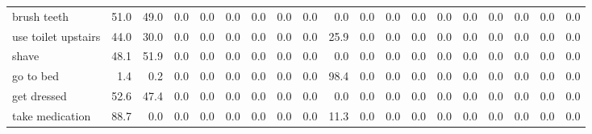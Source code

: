 \documentclass{article}
\begin{document}
\begin{sideways}
\begin{tabular}{lrrrrrrrrrrrrrrrrrr}
brush teeth                   &        51.0 &               49.0 &           0.0 &                          0.0 &                0.0 &                0.0 &                        0.0 &          0.0 &              0.0 &                0.0 &                    0.0 &                      0.0 &                  0.0 &                   0.0 &              0.0 &              0.0 &                                  0.0 &          0.0 \\
use toilet upstairs           &        44.0 &               30.0 &           0.0 &                          0.0 &                0.0 &                0.0 &                        0.0 &          0.0 &             25.9 &                0.0 &                    0.0 &                      0.0 &                  0.0 &                   0.0 &              0.0 &              0.0 &                                  0.0 &          0.0 \\
shave                         &        48.1 &               51.9 &           0.0 &                          0.0 &                0.0 &                0.0 &                        0.0 &          0.0 &              0.0 &                0.0 &                    0.0 &                      0.0 &                  0.0 &                   0.0 &              0.0 &              0.0 &                                  0.0 &          0.0 \\
go to bed                     &         1.4 &                0.2 &           0.0 &                          0.0 &                0.0 &                0.0 &                        0.0 &          0.0 &             98.4 &                0.0 &                    0.0 &                      0.0 &                  0.0 &                   0.0 &              0.0 &              0.0 &                                  0.0 &          0.0 \\
get dressed                   &        52.6 &               47.4 &           0.0 &                          0.0 &                0.0 &                0.0 &                        0.0 &          0.0 &              0.0 &                0.0 &                    0.0 &                      0.0 &                  0.0 &                   0.0 &              0.0 &              0.0 &                                  0.0 &          0.0 \\
take medication               &        88.7 &                0.0 &           0.0 &                          0.0 &                0.0 &                0.0 &                        0.0 &          0.0 &             11.3 &                0.0 &                    0.0 &                      0.0 &                  0.0 &                   0.0 &              0.0 &              0.0 &                                  0.0 &          0.0 \\

\end{tabular}
\end{sideways}
\end{document}
